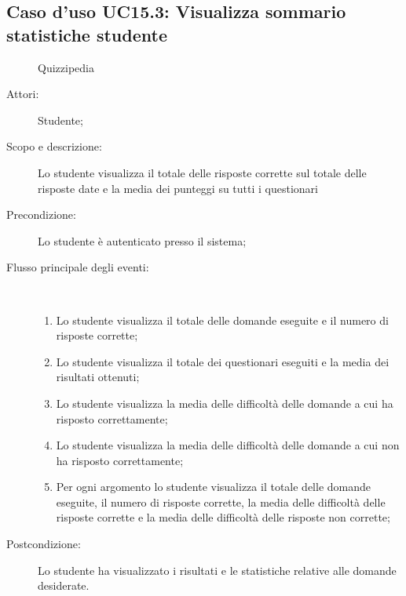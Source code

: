 \subsection{Caso d'uso UC15.3: Visualizza sommario statistiche studente}
	\begin{figure}[H]
		\centering
		\begin{resizedtikzpicture}{\textwidth}
		\begin{umlsystem}[x=0, fill=lightgray!20]{Quizzipedia}
		\end{umlsystem}
		\end{resizedtikzpicture}
		\caption{}
	\end{figure}
\begin{description}
\item[Attori:] Studente;
\item[Scopo e descrizione:] Lo studente visualizza il totale delle risposte corrette sul totale delle risposte date e la media dei punteggi su tutti i questionari
      \item[Precondizione:] Lo studente è autenticato presso il sistema;

        \item[Flusso principale degli eventi:] \ 
 \begin{enumerate}
          \item Lo studente visualizza il totale delle domande eseguite e il numero di risposte corrette;
          \item Lo studente visualizza il totale dei questionari eseguiti e la media dei risultati ottenuti;
          \item Lo studente visualizza la media delle difficoltà delle domande a cui ha risposto correttamente;
          \item Lo studente visualizza la media delle difficoltà delle domande a cui non ha risposto correttamente;
          \item Per ogni argomento lo studente visualizza il totale delle domande eseguite, il numero di risposte corrette, la media delle difficoltà delle risposte corrette e la media delle difficoltà delle risposte non corrette;

      \end{enumerate}
    \item[Postcondizione:] Lo studente ha visualizzato i risultati e le statistiche relative alle domande desiderate.
  \end{description}
\hypertarget{UC16}{}
